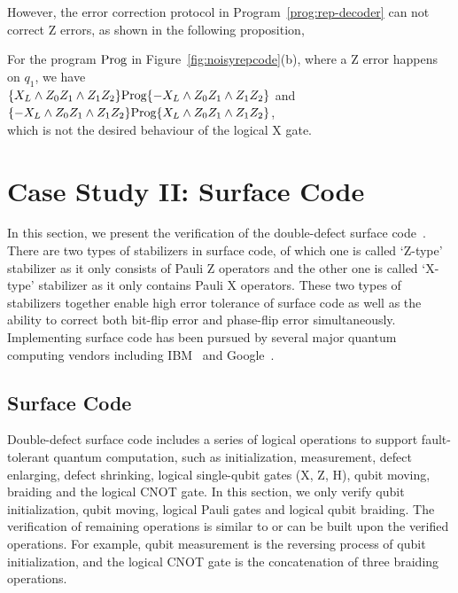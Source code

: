 However, the error correction protocol in Program~\ref{prog:rep-decoder} can not correct Z errors, as shown in the following proposition, \nothmskip
\begin{proposition} For the program $\text{Prog}$ in Figure~\ref{fig:noisyrepcode}(b), where a Z error happens on $q_1$, we have \\
$\{X_L \wedge Z_0Z_1 \wedge Z_1Z_2\}\text{Prog}\{-X_L \wedge Z_0Z_1 \wedge Z_1Z_2\}$ and $\{-X_L \wedge Z_0Z_1 \wedge Z_1Z_2\}\text{Prog}\{X_L \wedge Z_0Z_1 \wedge Z_1Z_2\}$, \\
which is not the desired behaviour of the logical X gate.
\end{proposition} \nothmskip
{}

\section{Case Study II: Surface Code}

In this section, we present the verification of the double-defect surface code~\cite{Fowler2012SurfaceCT}. There are two types of stabilizers in surface code, of which one is called `Z-type' stabilizer as it only consists of Pauli Z operators and the other one is called `X-type' stabilizer as it only contains Pauli X operators. These two types of stabilizers together enable high error tolerance of surface code as well as  the ability to correct both bit-flip error and phase-flip error simultaneously. 
Implementing surface code has been pursued by several major quantum computing vendors including IBM~\cite{Chamberland2020TopologicalAS} and Google~\cite{ChenSatzingerAtalayaKorotkovDunsworthSankQui2}.

\subsection{Surface Code}

Double-defect surface code includes a series of logical operations to support fault-tolerant quantum computation, such as 
initialization, measurement, defect enlarging, defect shrinking, logical single-qubit gates (X, Z, H), qubit moving, braiding and the logical CNOT gate. 
In this section, we only verify qubit initialization, qubit moving, logical Pauli gates and logical qubit braiding. The verification of remaining operations is similar to or can be built upon the verified operations.
For example, qubit measurement is the reversing process of qubit initialization, 
and the logical CNOT gate is the concatenation of three braiding operations.


